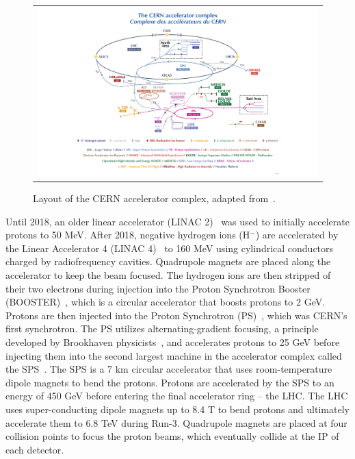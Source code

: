 \begin{figure}[tbh!]
 \begin{center}
 \begin{tabular}{c}
 \includegraphics[width=\textwidth]{figures/Part2/LHC/CERN}
 \end{tabular}
 \caption{Layout of the \ac{CERN} accelerator complex, adapted from~\cite{CERN:2022}.}
 \label{fig:LHC}
 \end{center}
\end{figure}

Until 2018, an older linear accelerator (LINAC 2)~\cite{Boltezar:1979ba} was used to initially accelerate protons to 50 MeV. After 2018, negative hydrogen ions (H$^{-}$) are accelerated by the Linear Accelerator 4 (LINAC 4)~\cite{Vretenar:2020quc} to 160 MeV using cylindrical conductors charged by radiofrequency cavities. Quadrupole magnets are placed along the accelerator to keep the beam focused.  The hydrogen ions are then stripped of their two electrons during injection into the Proton Synchrotron Booster (BOOSTER)~\cite{Reich:1969fw}, which is a circular accelerator that boosts protons to 2 GeV. Protons are then injected into the Proton Synchrotron (PS)~\cite{PS:1953}, which was \ac{CERN}'s first synchrotron. The PS utilizes alternating-gradient focusing, a principle developed by Brookhaven physicists~\cite{Courant:1952rn,PhysRev.88.1197}, and accelerates protons to 25 GeV before injecting them into the second largest machine in the accelerator complex called the \ac{SPS}~\cite{Adams:1970en}. The \ac{SPS} is a 7 km circular accelerator that uses room-temperature dipole magnets to bend the protons. Protons are accelerated by the \ac{SPS} to an energy of 450 GeV before entering the final accelerator ring -- the \ac{LHC}. The \ac{LHC} uses super-conducting dipole magnets up to 8.4 T to bend protons and ultimately accelerate them to 6.8 TeV during Run-3. Quadrupole magnets are placed at four collision points to focus the proton beams, which eventually collide at the \ac{IP} of each detector. 


